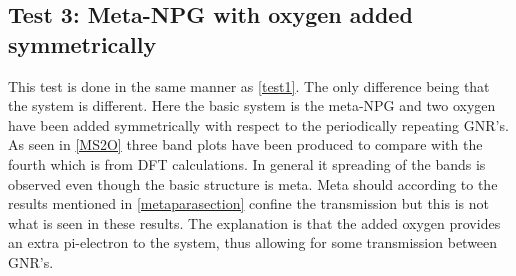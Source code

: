 \subsection{Test 3: Meta-NPG with oxygen added symmetrically}\label{test3}
This test is done in the same manner as \cref{test1}. The only difference being that the system is different. Here the basic system is the meta-NPG and two oxygen have been added symmetrically with respect to the periodically repeating GNR's. As seen in \cref{MS2O} three band plots have been produced to compare with the fourth which is from DFT calculations. In general it spreading of the bands is observed even though the basic structure is meta. Meta should according to the results mentioned in \cref{metaparasection} confine the transmission but this is not what is seen in these results. The explanation is that the added oxygen provides an extra pi-electron to the system, thus allowing for some transmission between GNR's.
